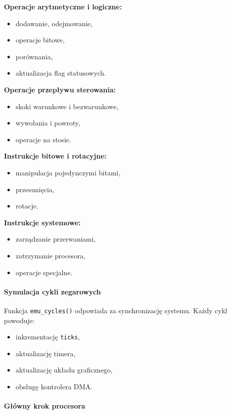 \documentclass{article}
\begin{document}
\textbf{Operacje arytmetyczne i logiczne:}
\begin{itemize}
	\item dodawanie, odejmowanie,
	\item operacje bitowe,
	\item porównania,
	\item aktualizacja flag statusowych.
\end{itemize}

\textbf{Operacje przepływu sterowania:}
\begin{itemize}
	\item skoki warunkowe i bezwarunkowe,
	\item wywołania i powroty,
	\item operacje na stosie.
\end{itemize}

\textbf{Instrukcje bitowe i rotacyjne:}
\begin{itemize}
	\item manipulacja pojedynczymi bitami,
	\item przesunięcia,
	\item rotacje.
\end{itemize}

\textbf{Instrukcje systemowe:}
\begin{itemize}
	\item zarządzanie przerwaniami,
	\item zatrzymanie procesora,
	\item operacje specjalne.
\end{itemize}

\paragraph{Symulacja cykli zegarowych}

Funkcja \texttt{emu\_cycles()} odpowiada za synchronizację systemu. Każdy cykl powoduje:
\begin{itemize}
	\item inkrementację \texttt{ticks},
	\item aktualizację timera,
	\item aktualizację układu graficznego,
	\item obsługę kontrolera DMA.
\end{itemize}

\paragraph{Główny krok procesora}
\end{document}

